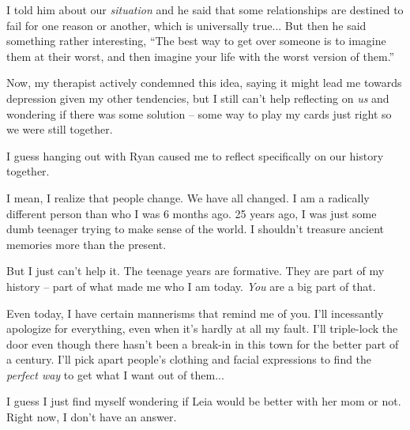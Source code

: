 I told him about our \textit{situation} and he said that some relationships are destined to fail for one reason or another, which is universally true...
But then he said something rather interesting, ``The best way to get over someone is to imagine them at their worst, and then imagine your life with the worst version of them.''

Now, my therapist actively condemned this idea, saying it might lead me towards depression given my other tendencies, but I still can't help reflecting on \textit{us} and wondering if there was some solution -- some way to play my cards just right so we were still together.

I guess hanging out with Ryan caused me to reflect specifically on our history together.

I mean, I realize that people change.
We have all changed.
I am a radically different person than who I was 6 months ago.
25 years ago, I was just some dumb teenager trying to make sense of the world.
I shouldn't treasure ancient memories more than the present.

But I just can't help it.
The teenage years are formative.
They are part of my history -- part of what made me who I am today.
\textit{You} are a big part of that.

Even today, I have certain mannerisms that remind me of you.
I'll incessantly apologize for everything, even when it's hardly at all my fault.
I'll triple-lock the door even though there hasn't been a break-in in this town for the better part of a century.
I'll pick apart people's clothing and facial expressions to find the \textit{perfect way} to get what I want out of them...

I guess I just find myself wondering if Leia would be better with her mom or not.
Right now, I don't have an answer.

